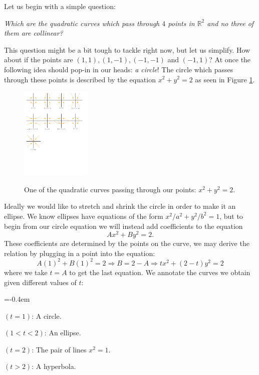 \documentclass[11pt]{article}
\newcommand{\bR}{\mathbb{R}}
\newcommand{\To}{\Rightarrow}           %
\theoremstyle{definition}
\theoremstyle{remark}
\numberwithin{theorem}{section}
\begin{document}
Let us begin with a simple question:
\begin{center}\begin{minipage}{0.9\textwidth}\centering\em
    Which are the quadratic curves which pass through $4$ points in $\bR^2$ and no three of them are collinear?
\end{minipage}\end{center}
This question might be a bit tough to tackle right now, but let us simplify. How about if the points are $(1,1),(1,-1),(-1,-1)$ and $(-1,1)$? At once the following idea should pop-in in our heads: \emph{a circle}! The circle which passes through these points is described by the equation $x^2+y^2=2$ as seen in Figure \ref{fig1}.
\begin{figure}[h!]
    \centering
    \includegraphics[width=0.3\textwidth, trim= 0.8cm 22.9cm 16cm 0.6cm,clip]{fig1.pdf}
    \label{fig1}
    \caption{One of the quadratic curves passing through our points: $x^2+y^2=2$.}
\end{figure}
Ideally we would like to stretch and shrink the circle in order to make it an ellipse. We know ellipses have equations of the form $x^2/a^2+y^2/b^2=1$, but to begin from our circle equation we will instead add coefficients to the equation 
$$Ax^2+By^2=2.$$
These coefficients are determined by the points on the curve, we may derive the relation by plugging in a point into the equation:
$$A(1)^2+B(1)^2=2\To B=2-A\To tx^2+(2-t)y^2=2$$
where we take $t=A$ to get the last equation.
We annotate the curves we obtain given different values of $t$:
\vspace{-0.5em}
\begin{itemize}
    \begin{multicols}{2}
        \itemsep=-0.4em
    \item $(t=1)$: A circle.
    \item $(1<t<2)$: An ellipse.
    \item $(t=2)$: The pair of lines $x^2=1$.
    \item $(t>2)$: A hyperbola.
    \end{multicols}
\end{itemize}
\end{document}
